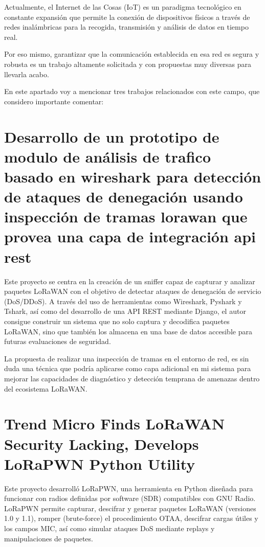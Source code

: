 
Actualmente, el Internet de las Cosas (IoT) es un paradigma tecnológico en constante expansión que permite la conexión de dispositivos físicos a través de redes inalámbricas para la recogida, transmisión y análisis de datos en tiempo real.

Por eso mismo, garantizar que la comunicación establecida en esa red es segura y robusta es un trabajo altamente solicitada y con propuestas muy diversas para llevarla acabo.

En este apartado voy a mencionar tres trabajos relacionados con este campo, que considero importante comentar:


\section{Desarrollo de un prototipo de modulo de análisis de
trafico basado en wireshark para detección de ataques de denegación usando inspección de tramas lorawan que provea una capa de integración api rest}

Este proyecto \cite{Rel1} se centra en la creación de un sniffer capaz de capturar y analizar paquetes LoRaWAN con el objetivo de detectar ataques de denegación de servicio (DoS/DDoS). A través del uso de herramientas como Wireshark, Pyshark y Tshark, así como del desarrollo de una API REST mediante Django, el autor consigue construir un sistema que no solo captura y decodifica paquetes LoRaWAN, sino que también los almacena en una base de datos accesible para futuras evaluaciones de seguridad.

 La propuesta de realizar una inspección de tramas en el entorno de red, es sin duda una técnica que podría aplicarse como capa adicional en mi sistema para mejorar las capacidades de diagnóstico y detección temprana de amenazas dentro del ecosistema LoRaWAN.
 


\section{Trend Micro Finds LoRaWAN Security Lacking, Develops LoRaPWN Python Utility}

Este proyecto \cite{Rel2} desarrolló LoRaPWN, una herramienta en Python diseñada para funcionar con radios definidas por software (SDR) compatibles con GNU Radio. LoRaPWN permite capturar, descifrar y generar paquetes LoRaWAN (versiones 1.0 y 1.1), romper (brute-force) el procedimiento OTAA, descifrar cargas útiles y los campos MIC, así como simular ataques DoS mediante replays y manipulaciones de paquetes.

